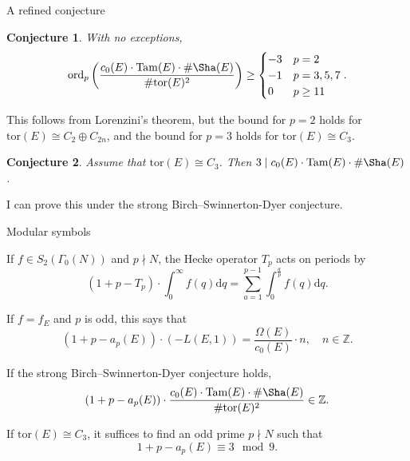 \documentclass[10pt]{beamer}
\newtheorem{conjecture}{Conjecture}
\begin{document}
\begin{frame}[t]{A refined conjecture}

\begin{conjecture}
With no exceptions,
$$ \mathrm{ord}_p\left(\dfrac{c_0(E) \cdot \mathrm{Tam}(E) \cdot \#\Sha(E)}{\#\mathrm{tor}(E)^2}\right) \ge \begin{cases}
-3 & p = 2 \\
-1 & p = 3, 5, 7 \\
0 & p \ge 11
\end{cases}. $$
\end{conjecture}

\pause

This follows from Lorenzini's theorem, but the bound for $ p = 2 $ holds for $ \mathrm{tor}(E) \cong C_2 \oplus C_{2n} $, and the bound for $ p = 3 $ holds for $ \mathrm{tor}(E) \cong C_3 $.

\pause

\vspace{0.5cm}

\begin{conjecture}
Assume that $ \mathrm{tor}(E) \cong C_3 $. Then $ 3 \mid c_0(E) \cdot \mathrm{Tam}(E) \cdot \#\Sha(E) $.
\end{conjecture}

\pause

\vspace{0.5cm} I can prove this under the strong Birch--Swinnerton-Dyer conjecture.

\end{frame}

\begin{frame}[t]{Modular symbols}

If $ f \in S_2(\Gamma_0(N)) $ and $ p \nmid N $, the Hecke operator $ T_p $ acts on periods by
$$ (1 + p - T_p) \cdot \int_0^\infty f(q)\mathrm{d}q = \sum_{a = 1}^{p - 1} \int_0^{\tfrac{a}{p}} f(q)\mathrm{d}q. $$

\pause

If $ f = f_E $ and $ p $ is odd, this says that
$$ (1 + p - a_p(E)) \cdot (-L(E, 1)) = \dfrac{\Omega(E)}{c_0(E)} \cdot n, \quad n \in \mathbb{Z}. $$

\pause

If the strong Birch--Swinnerton-Dyer conjecture holds,
$$ (1 + p - a_p(E)) \cdot \dfrac{c_0(E) \cdot \mathrm{Tam}(E) \cdot \#\Sha(E)}{\#\mathrm{tor}(E)^2} \in \mathbb{Z}. $$

\pause

If $ \mathrm{tor}(E) \cong C_3 $, it suffices to find an odd prime $ p \nmid N $ such that
$$ 1 + p - a_p(E) \equiv 3 \mod 9. $$

\end{frame}
\end{document}
